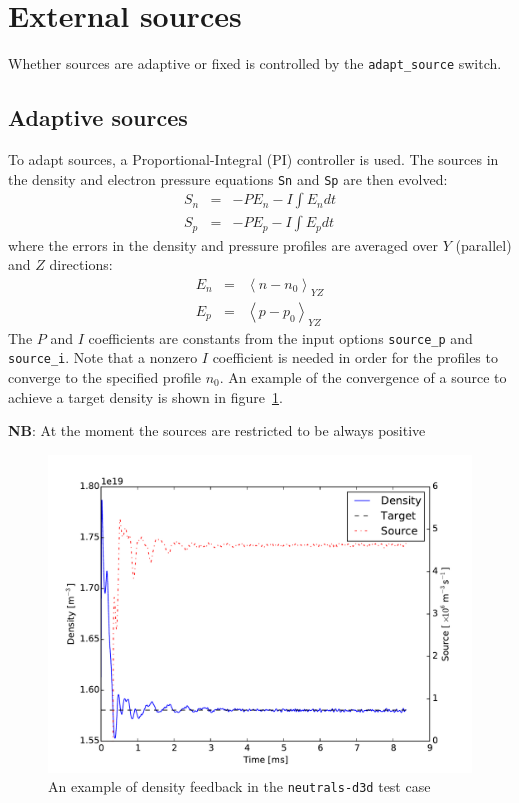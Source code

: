 \documentclass[12pt,a4paper]{article}
\begin{document}
\section{External sources}

Whether sources are adaptive or fixed is controlled by the
\texttt{adapt\_source} switch.

\subsection{Adaptive sources}

To adapt sources, a Proportional-Integral (PI) controller
is used. The sources in the density and electron pressure equations \texttt{Sn} and \texttt{Sp} are then evolved:
\begin{eqnarray}
  S_n &=& -P E_n - I \int E_n dt \\
  S_p &=& -P E_p - I \int E_p dt
\end{eqnarray}
where the errors in the density and pressure profiles are
averaged over $Y$ (parallel) and $Z$ directions:
\begin{eqnarray}
  E_n &=& \left< n - n_0\right>_{YZ} \\
  E_p &=& \left< p - p_0\right>_{YZ}
\end{eqnarray}
The $P$ and $I$ coefficients are constants from the input options
\texttt{source\_p} and \texttt{source\_i}. Note that a nonzero $I$ coefficient is needed in order for the profiles to converge to the specified profile $n_0$. An example of the convergence of a source to achieve a target density is shown in figure~\ref{fig:density_feedback}.

{\bf NB}: At the moment the sources are restricted to be always positive

\begin{figure}[h]
\centering
\includegraphics[width=0.7\columnwidth]{figs/DIII-D/density_feedback.pdf}
\caption{An example of density feedback in the \texttt{neutrals-d3d} test case}
\label{fig:density_feedback}
\end{figure}
\end{document}
